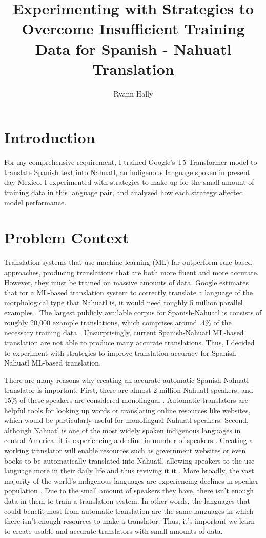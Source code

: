 \documentclass[10pt,twocolumn]{article}
\title{Experimenting with Strategies to Overcome Insufficient Training Data for Spanish - Nahuatl Translation}
\author{Ryann Hally}
\affiliation{Occidental College}
\begin{document}
\maketitle

\section{Introduction}
For my comprehensive requirement, I trained Google's T5 Transformer model to translate Spanish text into Nahuatl, an indigenous language spoken in present day Mexico. I experimented with strategies to make up for the small amount of training data in this language pair, and analyzed how each strategy affected model performance.

\section{Problem Context}

Translation systems that use machine learning (ML) far outperform rule-based approaches, producing translations that are both more fluent and more accurate. However, they must be trained on massive amounts of data. Google estimates that for a ML-based translation system to correctly translate a language of the morphological type that Nahuatl is, it would need roughly 5 million parallel examples  \cite{Chen}. The largest publicly available corpus for Spanish-Nahuatl is consists of roughly 20,000 example translations, which comprises around .4\% of the necessary training data \cite{SomosNLP}. Unsurprisingly, current Spanish-Nahuatl ML-based translation are not able to produce many accurate translations. Thus, I decided to experiment with strategies to improve translation accuracy for Spanish-Nahuatl ML-based translation.

There are many reasons why creating an accurate automatic Spanish-Nahuatl translator is important. First, there are almost 2 million Nahuatl speakers, and 15\% of these speakers are considered monolingual \cite{Nahuatl}. Automatic translators are helpful tools for looking up words or translating online resources like websites, which would be particularly useful for monolingual Nahuatl speakers. Second, although Nahuatl is one of the most widely spoken indigenous languages in central America, it is experiencing a decline in  number of speakers \cite{Nahuatl}. Creating a working translator will enable resources such as government websites or even books to be automatically translated into Nahuatl, allowing speakers to the use language more in their daily life and thus reviving it it \cite{SomosNLP}. More broadly, the vast majority of the world's indigenous languages are experiencing declines in speaker population \cite{IndigenousLanguageDeath}. Due to the small amount of speakers they have, there isn't enough data in them to train a translation system. In other words, the languages that could benefit most from automatic translation are the same languages in which there isn't enough resources to make a translator.  Thus, it's important we learn to create usable and accurate translators with small amounts of data. 
\end{document}
